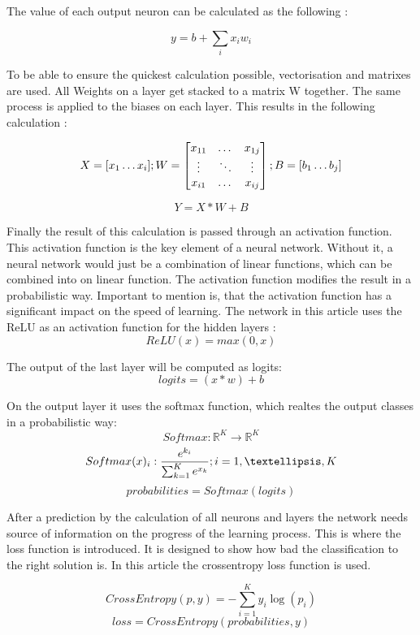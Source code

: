 The value of each output neuron can be calculated as the following \cite{medium_nn_from_scratch}:

$$y = b + \sum_{i} x_i w_i$$

To be able to ensure the quickest calculation possible, vectorisation and matrixes are used.
All Weights on a layer get stacked to a matrix W together.
The same process is applied to the biases on each layer.
This results in the following calculation
\cite{medium_nn_from_scratch}:

$$ X = [ x_1 \dots x_i ]; \space W = 
\begin{bmatrix}
    x_{11} & \dots  & x_{1j} \\
    \vdots & \ddots & \vdots \\
    x_{i1} & \dots  & x_{ij}
\end{bmatrix}; \space
B = [ b_1 \dots b_j ] $$

\begin{equation}
    Y = X * W + B
\end{equation}

Finally the result of this calculation is passed through an activation function.
This activation function is the key element of a neural network.
Without it, a neural network would just be a combination of linear functions, which can be combined into on linear function.
The activation function modifies the result in a probabilistic way.
Important to mention is, that the activation function has a significant impact on the speed of learning.
The network in this article uses the ReLU as an activation function for the hidden layers \cite{math_nn_skalski,relu}:
$$ReLU(x) = max(0,x)$$

The output of the last layer will be computed as logits:
$$logits = (x*w)+b$$

On the output layer it uses the softmax function, which realtes the output classes in a probabilistic way:
$$ Softmax : \mathbb{R}^K \to \mathbb{R}^K $$
$$ Softmax(x)_i : \frac{e^{k_i}}{\sum_{k=1}^K e^{x_k}}
\space ; i = 1, …, K
$$
$$probabilities = Softmax(logits)$$

After a prediction by the calculation of all neurons and layers the network needs source of information on the progress of the learning process.
This is where the loss function is introduced.
It is designed to show how bad the classification to the right solution is.
In this article the crossentropy loss function is used.
\cite{math_nn_skalski, medium_nn_from_scratch}

$$CrossEntropy(p,y) = -\sum_{i=1}^K y_i \log(p_i)$$
$$loss = CrossEntropy(probabilities, y)$$

